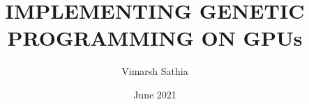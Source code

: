 \documentclass[BTech,thesis]{iitmdiss}
\begin{document}


\title{IMPLEMENTING GENETIC PROGRAMMING ON GPUs}
\author{Vimarsh Sathia}
\date{June 2021}

\begin{singlespace}
\maketitle 
\end{singlespace} 







\begin{singlespace}
\tableofcontents
\thispagestyle{empty}

\listoftables
{}
\listoffigures
{}
\end{singlespace}


% 








% 
% 

\end{document}

